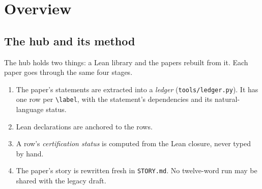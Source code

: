 \tableofcontents

\section{Overview}

\subsection{The hub and its method}

The hub holds two things: a Lean library and the papers rebuilt from it. Each paper goes through
the same four stages.
\begin{enumerate}
\item The paper's statements are extracted into a \emph{ledger} (\texttt{tools/ledger.py}). It
  has one row per \verb|\label|, with the statement's dependencies and its natural-language
  status.
\item Lean declarations are anchored to the rows.
\item A row's \emph{certification status} is computed from the Lean closure, never typed by hand.
\item The paper's story is rewritten fresh in \texttt{STORY.md}. No twelve-word run may be shared
  with the legacy draft.
\end{enumerate}

